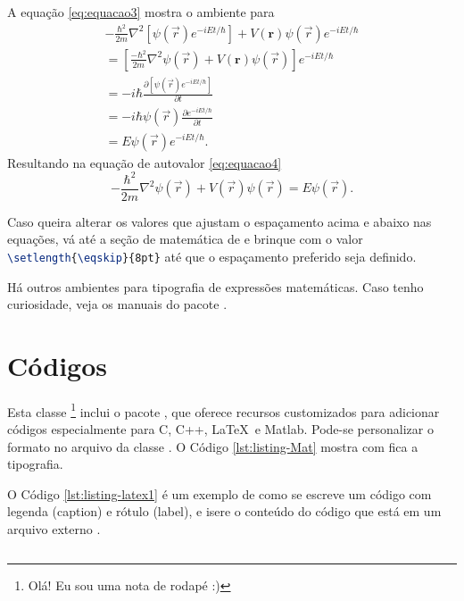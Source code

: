         
        A  equação \eqref{eq:equacao3} mostra o ambiente  para 
         \begin{multline} \label{eq:equacao3}
            -\frac{\hbar^2}{2m}\nabla^2\left[\psi(\vec r)e^{-iEt/\hbar}\right] + V(\mathbf{r})\psi(\vec r)e^{-iEt/\hbar} \\
            =\left[\frac{-\hbar^2}{2m}\nabla^2\psi(\vec r) + V(\mathbf{r})\psi(\vec r)\right]e^{-iEt/\hbar} \\
            = -i\hbar \frac{\partial\left[\psi(\vec r)e^{-iEt/\hbar}\right]}{\partial t}\\
            = -i\hbar \psi(\vec r)\frac{\partial e^{-iEt/\hbar}}{\partial t}\\
            = E \psi(\vec r) e^{-iEt/\hbar}.
        \end{multline}
        Resultando na equação de autovalor \eqref{eq:equacao4}
        \begin{equation}\label{eq:equacao4}
         -\frac{\hbar^{2}}{2m}\nabla^{2}\psi\left(\vec{r}\right)+V\left(\vec{r}\right)\psi(\vec{r})=E\psi\left(\vec{r}\right).
        \end{equation}

        Caso queira alterar os valores que ajustam o espaçamento acima e abaixo nas equações, vá até a seção de matemática de  e brinque com o valor  \lstinline[language=TeX]|\setlength{\eqskip}{8pt}|  até que o espaçamento preferido seja definido.
        
        Há outros ambientes para tipografia de expressões matemáticas. Caso tenho curiosidade, veja os manuais do pacote .

\section{Códigos}

    Esta classe \footnote{Olá! Eu sou uma nota de rodapé :)} inclui o pacote , que oferece recursos customizados para adicionar códigos especialmente para C, C++, \LaTeX\ e Matlab. Pode-se personalizar o formato no arquivo da classe . O Código \ref{lst:listing-Mat} mostra com fica a tipografia.

    \nolinenumbers
    
    \linenumbers
    
    O Código \ref{lst:listing-latex1} é um exemplo de como se escreve um código com legenda (caption) e rótulo (label), e isere o conteúdo do código que está em um arquivo externo .
    \nolinenumbers
\begin{lstlisting}[language=TeX,caption=Exemplo de listings com código em arquivo externo,label={lst:listing-latex1}]

\end{lstlisting}
    
